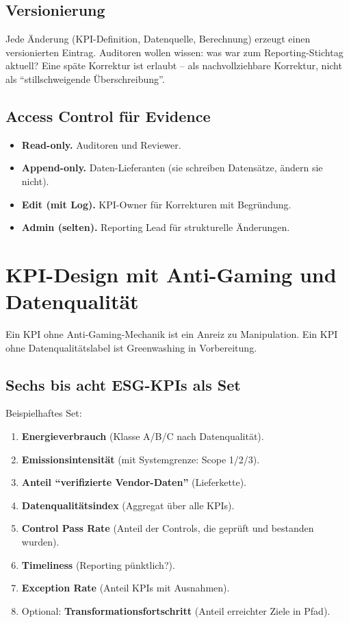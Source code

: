 \documentclass[11pt,a4paper,oneside]{article}
\begin{document}
\subsection{Versionierung}

Jede Änderung (KPI-Definition, Datenquelle, Berechnung) erzeugt einen versionierten Eintrag. Auditoren wollen wissen: was war zum Reporting-Stichtag aktuell? Eine späte Korrektur ist erlaubt -- als nachvollziehbare Korrektur, nicht als ``stillschweigende Überschreibung''.

\subsection{Access Control für Evidence}

\begin{itemize}
  \item \textbf{Read-only.} Auditoren und Reviewer.
  \item \textbf{Append-only.} Daten-Lieferanten (sie schreiben Datensätze, ändern sie nicht).
  \item \textbf{Edit (mit Log).} KPI-Owner für Korrekturen mit Begründung.
  \item \textbf{Admin (selten).} Reporting Lead für strukturelle Änderungen.
\end{itemize}

\section{KPI-Design mit Anti-Gaming und Datenqualität}

Ein KPI ohne Anti-Gaming-Mechanik ist ein Anreiz zu Manipulation. Ein KPI ohne Datenqualitätslabel ist Greenwashing in Vorbereitung.

\subsection{Sechs bis acht ESG-KPIs als Set}

Beispielhaftes Set:

\begin{enumerate}
  \item \textbf{Energieverbrauch} (Klasse A/B/C nach Datenqualität).
  \item \textbf{Emissionsintensität} (mit Systemgrenze: Scope 1/2/3).
  \item \textbf{Anteil ``verifizierte Vendor-Daten''} (Lieferkette).
  \item \textbf{Datenqualitätsindex} (Aggregat über alle KPIs).
  \item \textbf{Control Pass Rate} (Anteil der Controls, die geprüft und bestanden wurden).
  \item \textbf{Timeliness} (Reporting pünktlich?).
  \item \textbf{Exception Rate} (Anteil KPIs mit Ausnahmen).
  \item Optional: \textbf{Transformationsfortschritt} (Anteil erreichter Ziele in Pfad).
\end{enumerate}
\end{document}

